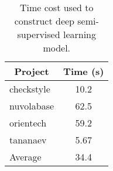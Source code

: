 \begin{table}[t!]
	\centering
	\caption{Time cost used to construct deep semi-supervised learning model.}
	\begin{tabular}{|l|c|}
		\hline
		\multicolumn{1}{|c|}{Project} & Time (s) \\
		\hline
		\hline
		checkstyle & 10.2 \\
		nuvolabase & 62.5 \\
		orientech & 59.2 \\
		tananaev & 5.67 \\
		\hline
		\hline 
		Average & 34.4 \\
		\hline 
	\end{tabular}%
	\label{tab:time}%
\end{table}%


